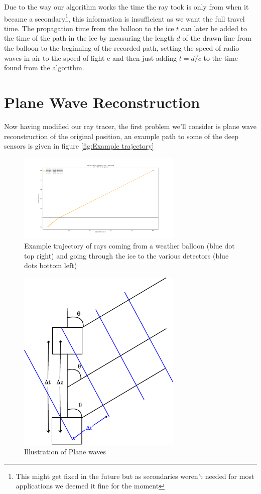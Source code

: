 \documentclass[11pt,a4paper,faculty=we,language=en,doctype=report]{cls/ugent-doc}
\begin{document}
Due to the way our algorithm works the time the ray took is only from when it
became a secondary\footnote{This might get fixed in the future but as
secondaries weren't needed for most applications we deemed it fine for the
moment}, this information is insufficient as we want the full travel time.  The
propagation time from the balloon to the ice $t$ can later be added to the time
of the path in the ice by measuring the length $d$ of the drawn line from the
balloon to the beginning of the recorded path, setting the speed of radio waves
in air to the speed of light c and then just adding $t = d/c$ to the time found
from the algorithm.
\section{Plane Wave Reconstruction}
Now having modified our ray tracer, the first problem we'll consider is
plane wave reconstruction of the original position, an example path
to some of the deep sensors is given in figure \ref{fig:Example
trajectory}
\begin{figure}
	\centering
	\includegraphics[width=0.7\textwidth]{weerballontraject.pdf}
	\caption{Example trajectory of rays coming from a weather balloon (blue dot top right) and going through the ice to the various detectors (blue dots bottom left)}
	\label{fig:Example trajectory}
\end{figure}
\begin{figure}
	\centering
	\includegraphics[width=0.7\textwidth]{planewave.pdf}
	\caption{Illustration of Plane waves}	
	\label{fig:Plane Wave}
\end{figure}
\end{document}
